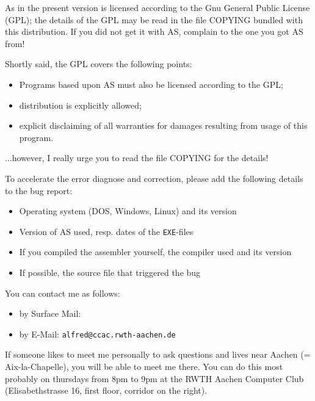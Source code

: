\documentclass[12pt,twoside]{report}
\newcommand{\tty}[1]{{\tt #1}}
\newcommand{\asname}{{AS}}
\begin{document}
As in the present version is licensed according to the Gnu General Public
License (GPL); the details of the GPL may be read in the file COPYING
bundled with this distribution.  If you did not get it with \asname{}, complain
to the one you got \asname{} from!

Shortly said, the GPL covers the following points:
\begin{itemize}
\item{Programs based upon \asname{} must also be licensed according to the GPL;}
\item{distribution is explicitly allowed;}
\item{explicit disclaiming of all warranties for damages resulting from
      usage of this program.}
\end{itemize}
...however, I really urge you to read the file COPYING for the details!

To accelerate the error diagnose and correction, please add the
following details to the bug report:
\begin{itemize}
\item{Operating system (DOS, Windows, Linux) and its version}
\item{Version of \asname{} used, resp. dates of the \tty{EXE}-files}
\item{If you compiled the assembler yourself, the compiler used and its version}
\item{If possible, the source file that triggered the bug}
\end{itemize}
You can contact me as follows:
\begin{itemize}
\item{by Surface Mail: }
\item{by E-Mail: \tty{alfred@ccac.rwth-aachen.de}}
\end{itemize}
If someone likes to meet me personally to ask questions and lives
near Aachen (= Aix-la-Chapelle), you will be able to meet me there.
You can do this most probably on thursdays from 8pm to 9pm at the
RWTH Aachen Computer Club (Elisabethstrasse 16, first floor, corridor
on the right).
\end{document}
